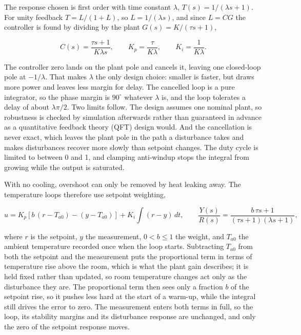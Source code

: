 The response chosen is first order with time constant $\lambda$, $T(s) = 1/(\lambda s + 1)$. For unity feedback $T = L/(1+L)$, so $L = 1/(\lambda s)$, and since $L = CG$ the controller is found by dividing by the plant $G(s) = K/(\tau s + 1)$,

\begin{equation}
C(s) = \frac{\tau s + 1}{K\lambda s}, \qquad K_p = \frac{\tau}{K\lambda}, \qquad K_i = \frac{1}{K\lambda}.
\label{eq:lambda-gains}
\end{equation}

The controller zero lands on the plant pole and cancels it, leaving one closed-loop pole at $-1/\lambda$. That makes $\lambda$ the only design choice: smaller is faster, but draws more power and leaves less margin for delay. The cancelled loop is a pure integrator, so the phase margin is $90^\circ$ whatever $\lambda$ is, and the loop tolerates a delay of about $\lambda\pi/2$. Two limits follow. The design assumes one nominal plant, so robustness is checked by simulation afterwards rather than guaranteed in advance as a quantitative feedback theory (QFT) design would. And the cancellation is never exact, which leaves the plant pole in the path a disturbance takes and makes disturbances recover more slowly than setpoint changes. The duty cycle is limited to between 0 and 1, and clamping anti-windup stops the integral from growing while the output is saturated.

With no cooling, overshoot can only be removed by heat leaking away. The temperature loops therefore use setpoint weighting,

\begin{equation}
u = K_p\left[b\,(r - T_{a0}) - (y - T_{a0})\right] + K_i \int (r - y)\,dt,
\qquad
\frac{Y(s)}{R(s)} = \frac{b\,\tau s + 1}{(\tau s + 1)(\lambda s + 1)},
\label{eq:setpoint-weighting}
\end{equation}

where $r$ is the setpoint, $y$ the measurement, $0 < b \le 1$ the weight, and $T_{a0}$ the ambient temperature recorded once when the loop starts. Subtracting $T_{a0}$ from both the setpoint and the measurement puts the proportional term in terms of temperature rise above the room, which is what the plant gain describes; it is held fixed rather than updated, so room temperature changes act only as the disturbance they are. The proportional term then sees only a fraction $b$ of the setpoint rise, so it pushes less hard at the start of a warm-up, while the integral still drives the error to zero. The measurement enters both terms in full, so the loop, its stability margins and its disturbance response are unchanged, and only the zero of the setpoint response moves.

